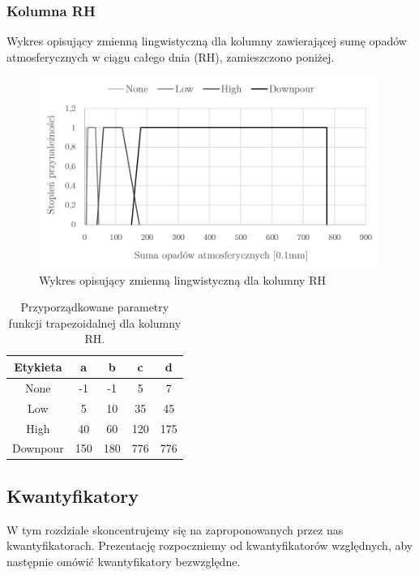\documentclass{classrep}
\begin{document}
\clearpage



\subsubsection{Kolumna RH}
Wykres opisujący zmienną lingwistyczną dla kolumny zawierającej sumę opadów atmosferycznych w ciągu całego dnia (RH), zamieszczono poniżej.
\begin{figure}[H]
	\centering
	\includegraphics[width=0.99\textwidth]{Pictures/TermsCharts/RH.png}
	\caption{Wykres opisujący zmienną lingwistyczną dla kolumny RH}
\end{figure}

\begin{table}[H]
	\centering
	\begin{tabular}{c c c c c} 
		\hline
		\textbf{Etykieta} & \textbf{a} & \textbf{b} & \textbf{c} & \textbf{d}\\ [0.5ex] 
		\hline
		\hline 
None	 & -1 & -1 & 5 & 7 \\
Low 	& 5 & 10 & 35 & 45 \\
High		 & 40 & 60 & 120 & 175 \\
Downpour	 & 150 & 180 & 776 & 776 \\
		\hline
	\end{tabular}
	\caption{Przyporządkowane parametry funkcji trapezoidalnej dla kolumny RH.}
\end{table}

\clearpage




\subsection{Kwantyfikatory}
W tym rozdziale skoncentrujemy się na zaproponowanych przez nas kwantyfikatorach. Prezentację rozpoczniemy od kwantyfikatorów względnych, aby następnie omówić kwantyfikatory bezwzględne.\newline
\end{document}
